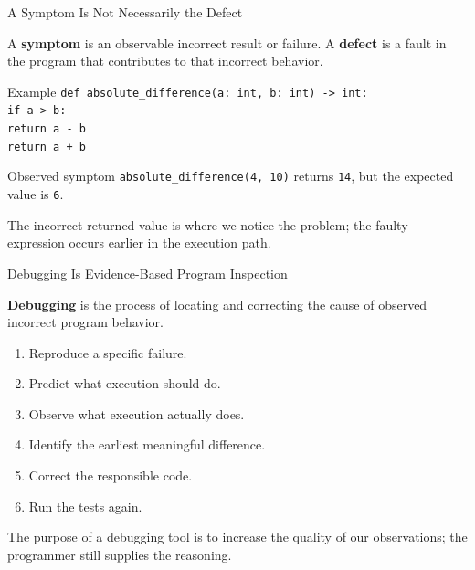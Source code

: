\documentclass[aspectratio=169,10pt]{beamer}
\begin{document}
\begin{frame}{A Symptom Is Not Necessarily the Defect}
  \begin{cpdefinition}
    A \textbf{symptom} is an observable incorrect result or failure. A \textbf{defect} is a fault in the program that contributes to that incorrect behavior.
  \end{cpdefinition}

  \begin{block}{Example}
    \texttt{def absolute\_difference(a: int, b: int) -> int:}\\
    \hspace*{0.20in}\texttt{if a > b:}\\
    \hspace*{0.40in}\texttt{return a - b}\\
    \hspace*{0.20in}\texttt{return a + b}
  \end{block}

  \begin{block}{Observed symptom}
    \texttt{absolute\_difference(4, 10)} returns \texttt{14}, but the expected value is \texttt{6}.
  \end{block}

  \begin{keyidea}
    The incorrect returned value is where we notice the problem; the faulty expression occurs earlier in the execution path.
  \end{keyidea}
\end{frame}

\begin{frame}{Debugging Is Evidence-Based Program Inspection}
  \begin{cpdefinition}
    \textbf{Debugging} is the process of locating and correcting the cause of observed incorrect program behavior.
  \end{cpdefinition}

  \begin{enumerate}
    \item Reproduce a specific failure.
    \item Predict what execution should do.
    \item Observe what execution actually does.
    \item Identify the earliest meaningful difference.
    \item Correct the responsible code.
    \item Run the tests again.
  \end{enumerate}

  \begin{keyidea}
    The purpose of a debugging tool is to increase the quality of our observations; the programmer still supplies the reasoning.
  \end{keyidea}
\end{frame}
\end{document}
